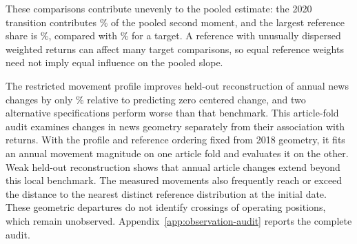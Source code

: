 These comparisons contribute unevenly to the pooled estimate:
the 2020 transition contributes \%
of the pooled second moment, and the largest reference share is
\%, compared with
\% for a target.
A reference with unusually dispersed weighted returns can affect many target
comparisons, so equal reference weights need not imply equal influence on
the pooled slope.

The restricted movement profile improves held-out reconstruction of annual
news changes by only \%
relative to predicting zero centered change, and two alternative
specifications perform worse than that benchmark.
This article-fold audit examines changes in news geometry separately from
their association with returns.
With the profile and reference ordering fixed from 2018 geometry, it fits an
annual movement magnitude on one article fold and evaluates it on the other.
Weak held-out reconstruction shows that annual article changes extend beyond
this local benchmark.
The measured movements also frequently reach or exceed the distance to the
nearest distinct reference distribution at the initial date.
These geometric departures do not identify crossings of operating positions,
which remain unobserved.
Appendix~\ref{app:observation-audit} reports the complete audit.
